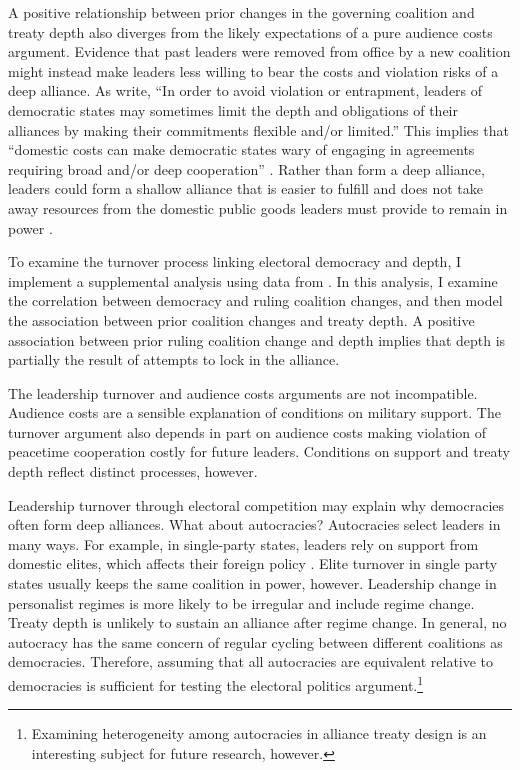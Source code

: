 \documentclass[12pt]{article}
\begin{document}
A positive relationship between prior changes in the governing coalition and treaty depth also diverges from the likely expectations of a pure audience costs argument.
Evidence that past leaders were removed from office by a new coalition might instead make leaders less willing to bear the costs and violation risks of a deep alliance.
As \citet[pg. 972]{Chibaetal2015} write, ``In order to avoid violation or entrapment, leaders of democratic states may sometimes limit the depth and obligations of their alliances by making their commitments flexible and/or limited.''
This implies that ``domestic costs can make democratic states wary of engaging in agreements requiring broad and/or deep cooperation'' \citep[pg. 980]{Chibaetal2015}. 
Rather than form a deep alliance, leaders could form a shallow alliance that is easier to fulfill and does not take away resources from the domestic public goods leaders must provide to remain in power \citep{BDMetal2002}. 


To examine the turnover process linking electoral democracy and depth, I implement a supplemental analysis using data from \citet{Mattesetal2016}. 
In this analysis, I examine the correlation between democracy and ruling coalition changes, and then model the association between prior coalition changes and treaty depth. 
A positive association between prior ruling coalition change and depth implies that depth is partially the result of attempts to lock in the alliance. 


The leadership turnover and audience costs arguments are not incompatible. 
Audience costs are a sensible explanation of conditions on military support.
The turnover argument also depends in part on audience costs making violation of peacetime cooperation costly for future leaders. 
Conditions on support and treaty depth reflect distinct processes, however.


Leadership turnover through electoral competition may explain why democracies often form deep alliances. 
What about autocracies? 
Autocracies select leaders in many ways. 
For example, in single-party states, leaders rely on support from domestic elites, which affects their foreign policy \citep{Weeks2014}.
Elite turnover in single party states usually keeps the same coalition in power, however.  
Leadership change in personalist regimes is more likely to be irregular and include regime change.
Treaty depth is unlikely to sustain an alliance after regime change.  
In general, no autocracy has the same concern of regular cycling between different coalitions as democracies.
Therefore, assuming that all autocracies are equivalent relative to democracies is sufficient for testing the electoral politics argument.\footnote{Examining heterogeneity among autocracies in alliance treaty design is an interesting subject for future research, however.} 
\end{document}
